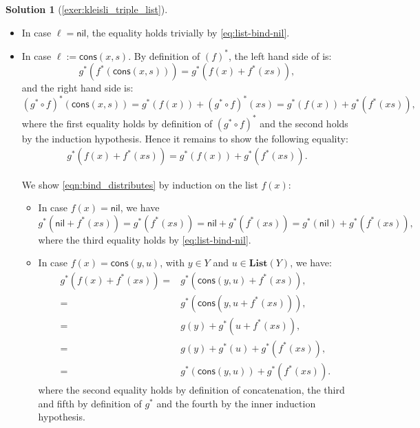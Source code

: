 \documentclass[a4paper,11pt, oneside,titlepage=false]{scrbook}
\theoremstyle{plain}
\theoremstyle{definition}
\newtheorem{solution}[thm]{Solution}
\newcommand{\Catb}[1]{\mathbf{#1}}
\newcommand{\List}{\Catb{List}}
\newcommand{\nil}{\ensuremath{\mathsf{nil}}}
\newcommand{\cons}{\ensuremath{\mathsf{cons}}}
\newcommand{\co}[2]{\ensuremath{#2 \circ #1}}
\begin{document}
\begin{solution}[\cref{exer:kleisli_triple_list}]
\begin{enumerate}
\begin{itemize}
\item In case $\ell = \nil$, the equality holds trivially by \cref{eq:list-bind-nil}.

\item In case $\ell := \cons(x,s)$. By definition of $(f)^{*}$, the left hand side of is:
\[
g^{*}(f^{*}(\cons(x,s))) = g^{*}(f(x) + f^{*}(xs)),
\]
and the right hand side is:
\[
(\co{f}{g^{*}})^{*}(\cons(x,s)) = g^{*}(f(x)) + (\co{f}{g^{*}})^{*}(xs) = g^{*}(f(x)) + g^{*}(f^{*}(xs)),
\]
where the first equality holds by definition of $(\co{f}{g^{*}})^{*}$ and the second holds by the induction hypothesis. Hence it remains to show the following equality:
\begin{align}\label{eqn:bind_distributes}
g^{*}(f(x) + f^{*}(xs)) = g^{*}(f(x)) + g^{*}(f^{*}(xs)).
\end{align}

We show \cref{eqn:bind_distributes} by induction on the list $f(x)$:
\begin{itemize}
\item In case $f(x) = \nil$, we have
\[
g^{*}(\nil + f^{*}(xs)) = g^{*}(f^{*}(xs)) = \nil + g^{*}(f^{*}(xs)) = g^{*}(\nil) + g^{*}(f^{*}(xs)),
\]
where the third equality holds by \cref{eq:list-bind-nil}.
\item In case $f(x) = \cons(y,u)$, with $y\in Y$ and $u\in \List(Y)$, we have:
\begin{eqnarray*}
g^{*}(f(x) + f^{*}(xs)) =& g^{*}(\cons(y,u) + f^{*}(xs)), \\
	=& g^{*}(\cons(y, u + f^{*}(xs))),\\
	=& g(y) + g^{*}(u + f^{*}(xs)),\\
	=& g(y) + g^{*}(u) + g^{*}(f^{*}(xs)),\\
	=& g^{*}(\cons(y,u)) + g^{*}(f^{*}(xs)).
\end{eqnarray*}
where the second equality holds by definition of concatenation, the third and fifth by definition of $g^{*}$ and the fourth by the inner induction hypothesis.

\end{itemize}
\end{itemize}
\end{enumerate}
\end{solution}
\end{document}
